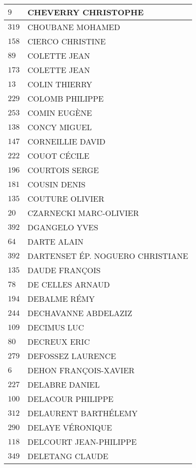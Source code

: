 \begin{xltabular}{\linewidth}{|l|X|}
    \hline
    $9$ & CHEVERRY CHRISTOPHE \\
    \hline
    $319$ & CHOUBANE MOHAMED \\
    \hline
    $158$ & CIERCO CHRISTINE \\
    \hline
    $89$ & COLETTE JEAN \\
    \hline
    $173$ & COLETTE JEAN \\
    \hline
    $13$ & COLIN THIERRY \\
    \hline
    $229$ & COLOMB PHILIPPE \\
    \hline
    $253$ & COMIN EUGÈNE \\
    \hline
    $138$ & CONCY MIGUEL \\
    \hline
    $147$ & CORNEILLIE DAVID \\
    \hline
    $222$ & COUOT CÉCILE \\
    \hline
    $196$ & COURTOIS SERGE \\
    \hline
    $181$ & COUSIN DENIS \\
    \hline
    $135$ & COUTURE OLIVIER \\
    \hline
    $20$ & CZARNECKI MARC-OLIVIER \\
    \hline
    $392$ & DGANGELO YVES \\
    \hline
    $64$ & DARTE ALAIN \\
    \hline
    $392$ & DARTENSET ÉP. NOGUERO CHRISTIANE \\
    \hline
    $135$ & DAUDE FRANÇOIS \\
    \hline
    $78$ & DE CELLES ARNAUD \\
    \hline
    $194$ & DEBALME RÉMY \\
    \hline
    $244$ & DECHAVANNE ABDELAZIZ \\
    \hline
    $109$ & DECIMUS LUC \\
    \hline
    $80$ & DECREUX ERIC \\
    \hline
    $279$ & DEFOSSEZ LAURENCE \\
    \hline
    $6$ & DEHON FRANÇOIS-XAVIER \\
    \hline
    $227$ & DELABRE DANIEL \\
    \hline
    $100$ & DELACOUR PHILIPPE \\
    \hline
    $312$ & DELAURENT BARTHÉLEMY \\
    \hline
    $290$ & DELAYE VÉRONIQUE \\
    \hline
    $118$ & DELCOURT JEAN-PHILIPPE \\
    \hline
    $349$ & DELETANG CLAUDE \\

\end{xltabular}
